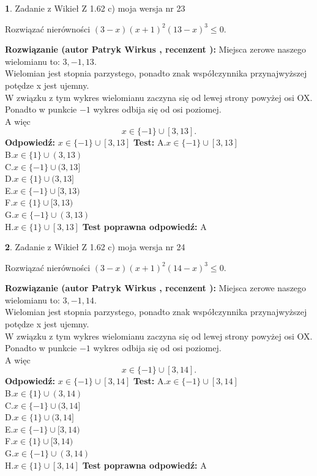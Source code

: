 \documentclass[12pt, a4paper]{article}
\theoremstyle{definition} %
\newtheorem{zad}{}
\newcommand{\zadStart}[1]{\begin{zad}#1\newline}
\newcommand{\zadStop}{\end{zad}}
\newcommand{\rozwStart}[2]{\noindent \textbf{Rozwiązanie (autor #1 , recenzent #2): }\newline}
\newcommand{\rozwStop}{\newline}
\newcommand{\odpStart}{\noindent \textbf{Odpowiedź:}\newline}
\newcommand{\odpStop}{\newline}
\newcommand{\testStart}{\noindent \textbf{Test:}\newline}
\newcommand{\testStop}{\newline}
\newcommand{\kluczStart}{\noindent \textbf{Test poprawna odpowiedź:}\newline}
\newcommand{\kluczStop}{\newline}
\begin{document}
\zadStart{Zadanie z Wikieł Z 1.62 c) moja wersja nr 23}

Rozwiązać nierówności $(3-x)(x+1)^{2}(13-x)^{3}\le0$.
\zadStop
\rozwStart{Patryk Wirkus}{}
Miejsca zerowe naszego wielomianu to: $3, -1, 13$.\\
Wielomian jest stopnia parzystego, ponadto znak współczynnika przy\linebreak najwyższej potędze x jest ujemny.\\ W związku z tym wykres wielomianu zaczyna się od lewej strony powyżej osi OX.\\
Ponadto w punkcie $-1$ wykres odbija się od osi poziomej.\\
A więc $$x \in \{-1\} \cup [3,13].$$
\rozwStop
\odpStart
$x \in \{-1\} \cup [3,13]$
\odpStop
\testStart
A.$x \in \{-1\} \cup [3,13]$\\
B.$x \in \{1\} \cup (3,13)$\\
C.$x \in \{-1\} \cup (3,13]$\\
D.$x \in \{1\} \cup (3,13]$\\
E.$x \in \{-1\} \cup [3,13)$\\
F.$x \in \{1\} \cup [3,13)$\\
G.$x \in \{-1\} \cup (3,13)$\\
H.$x \in \{1\} \cup [3,13]$
\testStop
\kluczStart
A
\kluczStop



\zadStart{Zadanie z Wikieł Z 1.62 c) moja wersja nr 24}

Rozwiązać nierówności $(3-x)(x+1)^{2}(14-x)^{3}\le0$.
\zadStop
\rozwStart{Patryk Wirkus}{}
Miejsca zerowe naszego wielomianu to: $3, -1, 14$.\\
Wielomian jest stopnia parzystego, ponadto znak współczynnika przy\linebreak najwyższej potędze x jest ujemny.\\ W związku z tym wykres wielomianu zaczyna się od lewej strony powyżej osi OX.\\
Ponadto w punkcie $-1$ wykres odbija się od osi poziomej.\\
A więc $$x \in \{-1\} \cup [3,14].$$
\rozwStop
\odpStart
$x \in \{-1\} \cup [3,14]$
\odpStop
\testStart
A.$x \in \{-1\} \cup [3,14]$\\
B.$x \in \{1\} \cup (3,14)$\\
C.$x \in \{-1\} \cup (3,14]$\\
D.$x \in \{1\} \cup (3,14]$\\
E.$x \in \{-1\} \cup [3,14)$\\
F.$x \in \{1\} \cup [3,14)$\\
G.$x \in \{-1\} \cup (3,14)$\\
H.$x \in \{1\} \cup [3,14]$
\testStop
\kluczStart
A
\kluczStop
\end{document}
